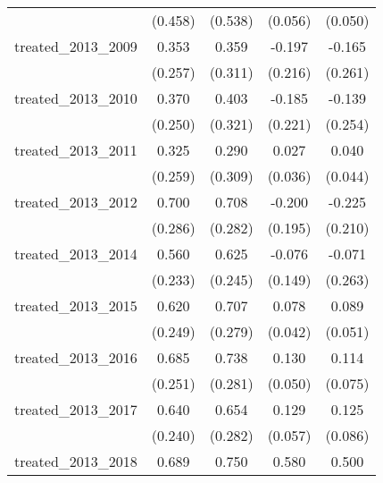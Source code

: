 {\begin{tabular}{l*{4}{c}}
            &     (0.458)         &     (0.538)         &     (0.056)         &     (0.050)         \\
[1em]
treated\_2013\_2009&       0.353         &       0.359         &      -0.197         &      -0.165         \\
            &     (0.257)         &     (0.311)         &     (0.216)         &     (0.261)         \\
[1em]
treated\_2013\_2010&       0.370         &       0.403         &      -0.185         &      -0.139         \\
            &     (0.250)         &     (0.321)         &     (0.221)         &     (0.254)         \\
[1em]
treated\_2013\_2011&       0.325         &       0.290         &       0.027         &       0.040         \\
            &     (0.259)         &     (0.309)         &     (0.036)         &     (0.044)         \\
[1em]
treated\_2013\_2012&       0.700\sym{*}  &       0.708\sym{*}  &      -0.200         &      -0.225         \\
            &     (0.286)         &     (0.282)         &     (0.195)         &     (0.210)         \\
[1em]
treated\_2013\_2014&       0.560\sym{*}  &       0.625\sym{*}  &      -0.076         &      -0.071         \\
            &     (0.233)         &     (0.245)         &     (0.149)         &     (0.263)         \\
[1em]
treated\_2013\_2015&       0.620\sym{*}  &       0.707\sym{*}  &       0.078         &       0.089         \\
            &     (0.249)         &     (0.279)         &     (0.042)         &     (0.051)         \\
[1em]
treated\_2013\_2016&       0.685\sym{**} &       0.738\sym{**} &       0.130\sym{**} &       0.114         \\
            &     (0.251)         &     (0.281)         &     (0.050)         &     (0.075)         \\
[1em]
treated\_2013\_2017&       0.640\sym{**} &       0.654\sym{*}  &       0.129\sym{*}  &       0.125         \\
            &     (0.240)         &     (0.282)         &     (0.057)         &     (0.086)         \\
[1em]
treated\_2013\_2018&       0.689\sym{**} &       0.750\sym{*}  &       0.580\sym{*}  &       0.500         \\

\end{tabular}}
